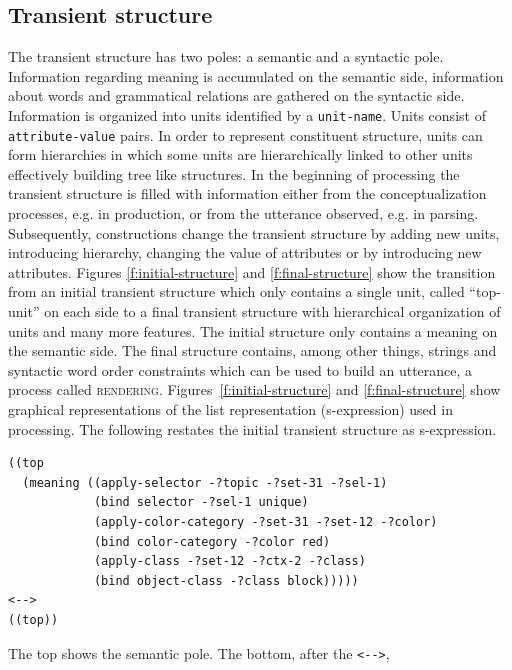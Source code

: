 \subsection{Transient structure}
The transient structure has two poles: a semantic and a syntactic pole.
Information regarding meaning is accumulated on the semantic
side, information about words and grammatical relations are
gathered on the syntactic side. Information is organized into 
units identified by a {\footnotesize\tt unit-name}. Units consist of {\footnotesize\tt attribute-value} pairs. 
In order to represent constituent structure, units can form hierarchies 
in which some units are hierarchically linked to other units effectively 
building tree like structures.
In the beginning of processing the transient structure is filled with 
information either from the conceptualization 
processes, e.g. in production, or from the utterance observed, e.g.
in parsing. Subsequently, constructions change the transient structure by adding new
units, introducing hierarchy, changing the value of attributes or by introducing 
new attributes. Figures \ref{f:initial-structure} and \ref{f:final-structure} show the transition from 
an initial transient structure which only contains a single unit, called ``top-unit'' 
on each side to a final transient structure with hierarchical organization of units 
and many more features. The initial structure only contains a 
meaning on the semantic side. The final structure contains,
among other things, strings and syntactic word order constraints 
which can be used to build an utterance, a process called \textsc{rendering}.
Figures~\ref{f:initial-structure} and \ref{f:final-structure} show graphical representations
of the list representation (s-expression) used in processing. The
following restates the initial transient structure as s-expression.
\begin{lstlisting}
((top
  (meaning ((apply-selector -?topic -?set-31 -?sel-1)
            (bind selector -?sel-1 unique)
            (apply-color-category -?set-31 -?set-12 -?color)
            (bind color-category -?color red)
            (apply-class -?set-12 -?ctx-2 -?class)
            (bind object-class -?class block)))))
<-->
((top))
\end{lstlisting}
The top shows the semantic pole. The bottom, after the {\footnotesize\verb|<-->|},
